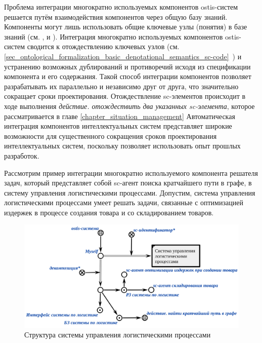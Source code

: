 Проблема интеграции многократно используемых компонентов ostis-систем решается путём взаимодействия компонентов через общую базу знаний. Компоненты могут лишь использовать общие ключевые узлы (понятия) в базе знаний (см. ,  и ). Интеграция многократно используемых компонентов ostis-систем сводится к отождествлению ключевых узлов (см. \ref{sec_ontological_formalization_basic_denotational_semantics_sc-code}~) и устранению возможных дублирований и противоречий исходя из спецификации компонента и его содержания. Такой способ интеграции компонентов позволяет разрабатывать их параллельно и независимо друг от друга, что значительно сокращает сроки проектирования. Отождествление sc-элементов происходит в ходе выполнения \textit{действие. отождествить два указанных sc-элемента}, которое рассматривается в главе \ref{chapter_situation_management} Автоматическая интеграция компонентов интеллектуальных систем представляет широкие возможности для существенного сокращения сроков проектирования интеллектуальных систем, поскольку позволяет использовать опыт прошлых разработок.

Рассмотрим пример интеграции многократно используемого компонента решателя задач, который представляет собой sc-агент поиска кратчайшего пути в графе, в систему управления логистическими процессами. Допустим, система управления логистическими процессами умеет решать задачи, связанные с оптимизацией издержек в процессе создания товара и со складированием товаров. 

\begin{figure}[H]
	\includegraphics[scale=0.5]{author/part5/figures/logistics_system.png}
	\caption{Структура системы управления логистическими процессами}
	\label{fig:logistics_system}
\end{figure}

